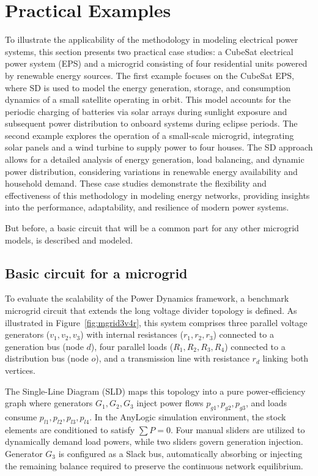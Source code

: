 \documentclass[energies,accept,oneauthor,pdftex]{Definitions/mdpi}
\begin{document}
\section{Practical Examples}
\label{sec:practical_cases}


To illustrate the applicability of the methodology in modeling electrical power systems, this section presents two practical case studies: a CubeSat electrical power system (EPS) and a microgrid consisting of four residential units powered by renewable energy sources. The first example focuses on the CubeSat EPS, where SD is used to model the energy generation, storage, and consumption dynamics of a small satellite operating in orbit. This model accounts for the periodic charging of batteries via solar arrays during sunlight exposure and subsequent power distribution to onboard systems during eclipse periods. The second example explores the operation of a small-scale microgrid, integrating solar panels and a wind turbine to supply power to four houses. The SD approach allows for a detailed analysis of energy generation, load balancing, and dynamic power distribution, considering variations in renewable energy availability and household demand. These case studies demonstrate the flexibility and effectiveness of this methodology in modeling energy networks, providing insights into the performance, adaptability, and resilience of modern power systems.


But before, a basic circuit that will be a common part for any other microgrid models, is described and modeled.


\subsection{Basic circuit for a microgrid}
To evaluate the scalability of the Power Dynamics framework, a benchmark microgrid circuit that extends the long voltage divider topology is defined. As illustrated in Figure~\ref{fig:mgrid3v4r}, this system comprises three parallel voltage generators ($v_1, v_2, v_3$) with internal resistances ($r_1, r_2, r_3$) connected to a generation bus (node $d$), four parallel loads ($R_1, R_2, R_3, R_4$) connected to a distribution bus (node $o$), and a transmission line with resistance $r_d$ linking both vertices.

The Single-Line Diagram (SLD) maps this topology into a pure power-efficiency graph where generators $G_1, G_2, G_3$ inject power flows $p_{g1}, p_{g2}, p_{g3}$, and loads consume $p_{l1}, p_{l2}, p_{l3}, p_{l4}$. In the AnyLogic simulation environment, the stock elements are conditioned to satisfy $\sum P = 0$. Four manual sliders are utilized to dynamically demand load powers, while two sliders govern generation injection. Generator $G_3$ is configured as a Slack bus, automatically absorbing or injecting the remaining balance required to preserve the continuous network equilibrium.
\end{document}
